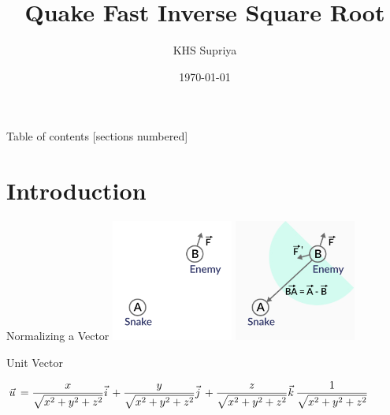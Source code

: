 \documentclass[10pt]{beamer}
\title{Quake \RNum{3} Fast Inverse Square Root}
\date{\today}
\author{KHS Supriya}
\begin{document}
\maketitle

\begin{frame}{Table of contents}
  [sections numbered]
  \tableofcontents%
\end{frame}

\section[Games \& Inverse sqrt]{Introduction}

\begin{frame}[fragile]{Normalizing a Vector}
    \includegraphics[width=4cm, height=4cm]{images/dot_product1.png}
    \includegraphics[width=4cm, height=4cm]{images/dot_product2_edited_twice.jpg}
    \newline
    
\end{frame}


\begin{frame}[fragile]{Unit Vector}
    \begin{center}
        $\vec{u}^{\,} = \dfrac{x}{\sqrt{{x}^2+{y}^2+{z}^2}}\vec{i}^{\,} + \dfrac{y}{\sqrt{{x}^2+{y}^2+{z}^2}}\vec{j}^{\,} + \dfrac{z}{\sqrt{{x}^2+{y}^2+{z}^2}}\vec{k}^{\,}
        \newline
        \newline
        \newline
        \dfrac{1}{\sqrt{{x}^2+{y}^2+{z}^2}}
        $
    \end{center}
\end{frame}
\end{document}
